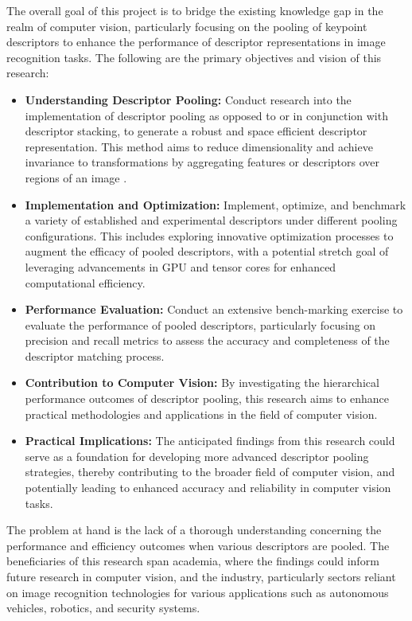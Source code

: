 The overall goal of this project is to bridge the existing knowledge gap in the realm of computer vision, particularly focusing on the pooling of keypoint descriptors to enhance the performance of descriptor representations in image recognition tasks. The following are the primary objectives and vision of this research:

\begin{itemize}
    \item \textbf{Understanding Descriptor Pooling:} Conduct research into the implementation of descriptor pooling as opposed to or in conjunction with descriptor stacking, to generate a robust and space efficient descriptor representation. This method aims to reduce dimensionality and achieve invariance to transformations by aggregating features or descriptors over regions of an image \cite{dong2015domain}.

    \item \textbf{Implementation and Optimization:} Implement, optimize, and benchmark a variety of established and experimental descriptors under different pooling configurations. This includes exploring innovative optimization processes to augment the efficacy of pooled descriptors, with a potential stretch goal of leveraging advancements in GPU and tensor cores for enhanced computational efficiency.

    \item \textbf{Performance Evaluation:} Conduct an extensive bench-marking exercise to evaluate the performance of pooled descriptors, particularly focusing on precision and recall metrics to assess the accuracy and completeness of the descriptor matching process.

    \item \textbf{Contribution to Computer Vision:} By investigating the hierarchical performance outcomes of descriptor pooling, this research aims to enhance practical methodologies and applications in the field of computer vision.

    \item \textbf{Practical Implications:} The anticipated findings from this research could serve as a foundation for developing more advanced descriptor pooling strategies, thereby contributing to the broader field of computer vision, and potentially leading to enhanced accuracy and reliability in computer vision tasks.
\end{itemize}

The problem at hand is the lack of a thorough understanding concerning the performance and efficiency outcomes when various descriptors are pooled. The beneficiaries of this research span academia, where the findings could inform future research in computer vision, and the industry, particularly sectors reliant on image recognition technologies for various applications such as autonomous vehicles, robotics, and security systems.

